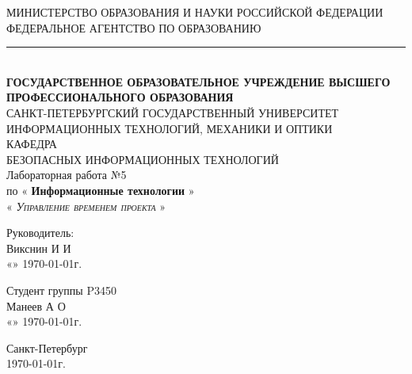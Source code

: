 \begin{titlepage}
	\newpage

	\begin{center}
		\newlength{\HeadLength}
		\settowidth{\HeadLength}{МИНИСТЕРСТВО ОБРАЗОВАНИЯ И НАУКИ РОССИЙСКОЙ ФЕДЕРАЦИИ}
		МИНИСТЕРСТВО ОБРАЗОВАНИЯ И НАУКИ РОССИЙСКОЙ ФЕДЕРАЦИИ\\
		ФЕДЕРАЛЬНОЕ АГЕНТСТВО ПО ОБРАЗОВАНИЮ\\
		\rule{\HeadLength}{0.4mm}\\
		\vspace{1.0cm}
		{\fontsize{8pt}{10}
			\selectfont \textbf{ГОСУДАРСТВЕННОЕ ОБРАЗОВАТЕЛЬНОЕ УЧРЕЖДЕНИЕ ВЫСШЕГО ПРОФЕССИОНАЛЬНОГО ОБРАЗОВАНИЯ}\\
		}
		\vspace{1.0cm}
		САНКТ-ПЕТЕРБУРГСКИЙ ГОСУДАРСТВЕННЫЙ УНИВЕРСИТЕТ\\
		ИНФОРМАЦИОННЫХ ТЕХНОЛОГИЙ, МЕХАНИКИ И ОПТИКИ\\
		\vspace{1.5cm}
		КАФЕДРА\\
		БЕЗОПАСНЫХ ИНФОРМАЦИОННЫХ ТЕХНОЛОГИЙ\\
		\vspace{2.5cm}
		\Large{Лабораторная работа №5}\\
		по
		«
		\textbf{
		Информационные технологии
		}
		»\\
		\vspace{1.0cm}
		«
		\textsc{\textit{
		Управление временем проекта
		}}
		»\\
	\end{center}

	\vspace{\fill}

	\newlength{\ML}

	\hfill\begin{minipage}{0.45\textwidth}
	Руководитель:\\
	\underline{\hspace{\ML}}
		Викснин И И
	\\
	«\underline{\hspace{0.7cm}}» \underline{\hspace{2cm}} \CurrentYear\today г.
	\end{minipage}%
	\bigskip

	\hfill\begin{minipage}{0.45\textwidth}
	Студент группы 
		P3450
	\\
	\underline{\hspace{\ML}}
		Манеев А О
	\\
	«\underline{\hspace{0.7cm}}» \underline{\hspace{2cm}} \CurrentYear\today г.
	\end{minipage}%

	\vspace{2.5cm}

	\begin{center}
	Санкт-Петербург\\
	\CurrentYear\today г.
	\end{center}
	\newpage

\end{titlepage}
